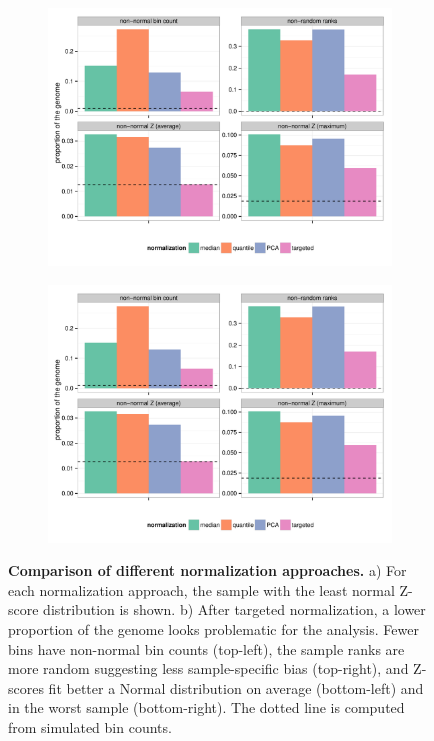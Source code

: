 \begin{figure}[htp]
  \begin{subfigure}[b]{.48\textwidth}
    \includegraphics[width=\linewidth,page=2]{figures/cagekid-5kbp-normComparison.pdf}
    \caption{}
    \label{fig:zscoreEx:worstZ}
  \end{subfigure}
  \begin{subfigure}[b]{.48\textwidth}
    \includegraphics[width=\linewidth,page=1]{figures/cagekid-5kbp-normComparison.pdf}
    \caption{}
    \label{fig:normComp}
  \end{subfigure}
  \caption[Comparison of different normalization approaches.]{{\bf Comparison of different normalization approaches.} {\small a) For each normalization approach, the sample with the least normal Z-score distribution is shown. b) After targeted normalization, a lower proportion of the genome looks problematic for the analysis. Fewer bins have non-normal bin counts (top-left), the sample ranks are more random suggesting less sample-specific bias (top-right), and Z-scores fit better a Normal distribution on average (bottom-left) and in the worst sample (bottom-right). The dotted line is computed from simulated bin counts. }}
\end{figure}

